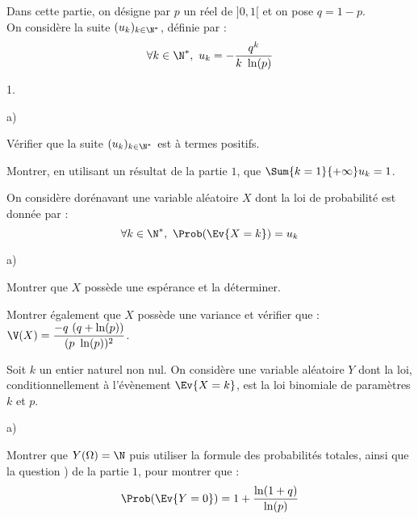 \documentclass[11pt]{article}%
\begin{document}
\noindent
Dans cette partie, on désigne par $p$ un réel de $]0,1[$ et on pose $q
= 1-p$.\\
On considère la suite $(u_k)_{k\in\N^{*}}$, définie par :
\[
\forall k\in\N^*, \ u_k = -\dfrac{q^{k}}{k \ \ln(p)}
\]
\begin{noliste}{1.}
  \setlength{\itemsep}{4mm}
\item
  \begin{noliste}{a)}
    \setlength{\itemsep}{2mm}
  \item Vérifier que la suite $(u_k)_{k\in\N^{*}}$ est à termes
    positifs.

    




  \item Montrer, en utilisant un résultat de la partie $1$, que
    $\Sum{k = 1}{+ \infty} u_k = 1$.

    
  \end{noliste}
  On considère dorénavant une variable aléatoire $X$ dont la loi de
  probabilité est donnée par :
  \[
  \forall k\in\N^{*}, \ \Prob(\Ev{X = k}) = u_k
  \]
  
\item
  \begin{noliste}{a)}
    \setlength{\itemsep}{2mm}
  \item Montrer que $X$ possède une espérance et la déterminer.

    




  \item Montrer également que $X$ possède une variance et vérifier que
    : $\V(X) = \dfrac{-q \ (q + \ln(p))}{(p \ \ln(p))^{2}}$.

    
  \end{noliste}

\item Soit $k$ un entier naturel non nul. On considère une variable
  aléatoire $Y$ dont la loi, conditionnellement à l'évènement $\Ev{X =
    k}$, est la loi binomiale de paramètres $k$ et $p$.

  \begin{noliste}{a)}
    \setlength{\itemsep}{2mm}
  \item Montrer que $Y(\Omega) = \N$ puis utiliser la formule des
    probabilités totales, ainsi que la question ) de la partie
    $1$, pour montrer que :
    \[
    \Prob(\Ev{Y = 0}) = 1 + \dfrac{\ln(1 + q)}{\ln(p)}
    \]





\end{noliste}
\end{noliste}
\end{document}
